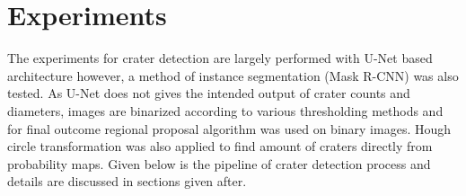 \documentclass[11pt]{article}
\begin{document}

\section{Experiments}
The experiments for crater detection are largely performed with U-Net based architecture however, a method of instance segmentation (Mask R-CNN) was also tested. As U-Net does not gives the intended output of crater counts and diameters, images are binarized according to various thresholding methods and for final outcome regional proposal algorithm was used on binary images. Hough circle transformation was also applied to find amount of craters directly from probability maps. Given below is the pipeline of crater detection process and details are discussed in sections given after.
\end{document}
